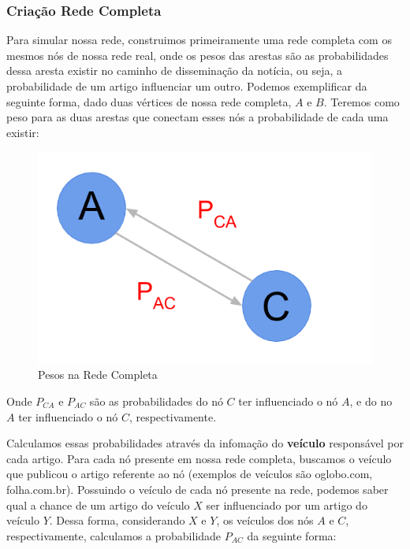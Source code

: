 \documentclass[a4paper,12pt]{article}
\begin{document}
\pagebreak
\subsubsection{Criação Rede Completa}


 Para simular nossa rede, construimos primeiramente uma rede completa com os mesmos nós de nossa rede real, onde os pesos das arestas
 são as probabilidades dessa aresta existir no caminho de disseminação da notícia, ou seja, a probabilidade de um artigo influenciar um 
 outro. Podemos exemplificar da seguinte forma, dado duas vértices de nossa rede completa, $A$ e $B$. Teremos como peso para as duas 
 arestas que conectam esses nós a probabilidade de cada uma existir:
 
 \begin{figure}[ht]
 \centering
 \includegraphics[scale=0.3]{./rede5.png}
 \caption{Pesos na Rede Completa}
\end{figure}

 Onde $P_{CA}$ e $P_{AC}$ são as probabilidades do nó $C$ ter influenciado o nó $A$, e do no $A$ ter influenciado o nó $C$, 
 respectivamente.

 Calculamos essas probabilidades através da infomação do \textbf{veículo} responsável por cada artigo. Para cada nó presente em nossa rede completa,
 buscamos o veículo que publicou o artigo referente ao nó (exemplos de veículos são oglobo.com, folha.com.br). Possuindo o veículo de cada
 nó presente na rede, podemos saber qual a chance de um artigo do veículo $X$ ser influenciado por um artigo do veículo $Y$. Dessa forma, 
 considerando $X$ e $Y$, os veículos dos nós $A$ e $C$, respectivamente, calculamos a probabilidade $P_{AC}$ da seguinte forma:
 
\end{document}
